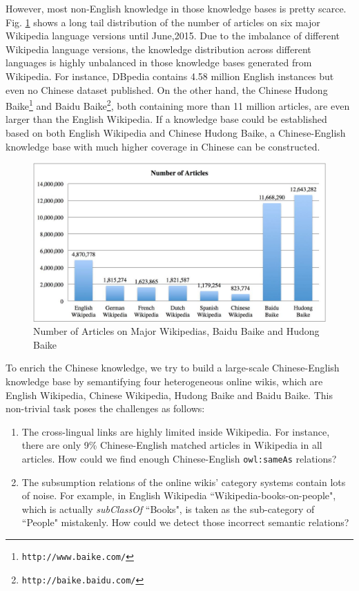 \documentclass[runningheads,a4paper]{llncs}
\begin{document}
However, most non-English knowledge in those knowledge bases is pretty scarce. Fig. \ref{fig_stat} shows a long tail distribution of the number of articles on six major Wikipedia language versions until June,2015. Due to the imbalance of different Wikipedia language versions, the knowledge distribution across different languages is highly unbalanced in those knowledge bases generated from Wikipedia. For instance, DBpedia contains 4.58 million English instances but even no Chinese dataset published. On the other hand, the Chinese Hudong Baike\footnote{{\tt http://www.baike.com/}} and Baidu Baike\footnote{{\tt http://baike.baidu.com/}}, both containing more than 11 million articles, are even larger than the English Wikipedia. If a knowledge base could be established based on both English Wikipedia and Chinese Hudong Baike, a Chinese-English knowledge base with much higher coverage in Chinese can be constructed.

\begin{figure}[ht]
\centering
\includegraphics[width=0.75 \columnwidth]{fig/fig_stat.png}
\caption{Number of Articles on Major Wikipedias, Baidu Baike and Hudong Baike}
\label{fig_stat}
\end{figure}

To enrich the Chinese knowledge, we try to build a large-scale Chinese-English knowledge base by semantifying four heterogeneous online wikis, which are English Wikipedia, Chinese Wikipedia, Hudong Baike and Baidu Baike. This non-trivial task poses the challenges as follows:
\begin{enumerate}
  \item The cross-lingual links are highly limited inside Wikipedia. For instance, there are only 9\% Chinese-English matched articles in Wikipedia in all articles. How could we find enough Chinese-English \verb"owl:sameAs" relations?
  \item The subsumption relations of the online wikis' category systems contain lots of noise. For example, in English Wikipedia ``Wikipedia-books-on-people", which is actually \textit{subClassOf} ``Books", is taken as the sub-category of ``People" mistakenly. How could we detect those incorrect semantic relations?
\end{enumerate}
\end{document}
